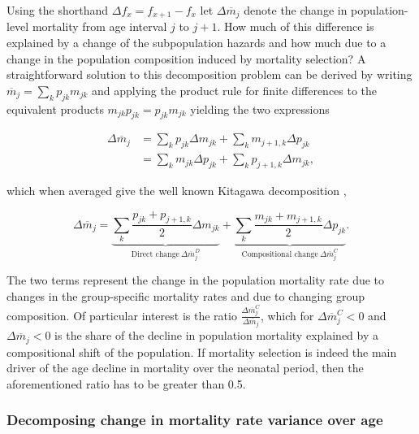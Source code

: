 \documentclass[10pt,twoside,reqno]{article}
\begin{document}
Using the shorthand \(\Delta f_x=f_{x+1}-f_x\) let \(\Delta \overline{m}_j\) denote the change in population-level mortality from age interval \(j\) to \(j+1\). How much of this difference is explained by a change of the subpopulation hazards and how much due to a change in the population composition induced by mortality selection? A straightforward solution to this decomposition problem can be derived by writing \(\overline{m}_j = \sum_kp_{jk}m_{jk}\) and applying the product rule for finite differences \citep{Boole1880} to the equivalent products \(m_{jk}p_{jk}=p_{jk}m_{jk}\) yielding the two expressions

\[
\begin{aligned}
  \Delta \overline{m}_j
  &= \sum_k p_{jk}\Delta m_{jk} + \sum_k m_{j+1,k} \Delta p_{jk} \\
  &= \sum_k m_{jk}\Delta p_{jk} + \sum_k p_{j+1,k} \Delta m_{jk},
\end{aligned}
\]

which when averaged give the well known Kitagawa decomposition \citep{Kitagawa1955},

\begin{equation}
  \Delta \overline{m}_j =
    \underbrace{
      \sum_k \frac{p_{jk}+p_{j+1,k}}{2}\Delta m_{jk}
    }_{
      \text{Direct change}~\Delta \overline{m}_j^D
    } +
    \underbrace{
      \sum_k \frac{m_{jk}+m_{j+1,k}}{2}\Delta p_{jk}
    }_{
      \text{Compositional change}~\Delta \overline{m}_j^C
    }.
\label{eq:decomp-rate}
\end{equation}

The two terms represent the change in the population mortality rate due to changes in the group-specific mortality rates and due to changing group composition. Of particular interest is the ratio \(\frac{\Delta \overline{m}_j^C}{\Delta \overline{m}_j}\), which for \(\Delta\overline{m}_j^C<0\) and \(\Delta \overline{m}_j<0\) is the share of the decline in population mortality explained by a compositional shift of the population. If mortality selection is indeed the main driver of the age decline in mortality over the neonatal period, then the aforementioned ratio has to be greater than 0.5.

\subsubsection*{Decomposing change in mortality rate variance over age}\label{decomposing-change-in-mortality-rate-variance-over-age}
\end{document}
